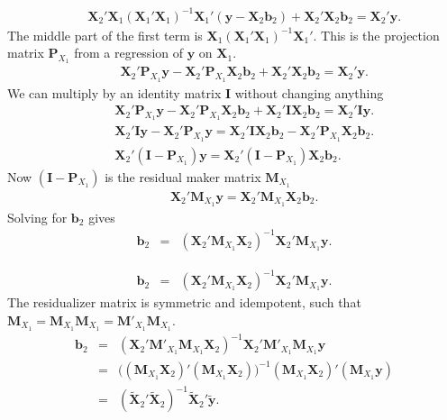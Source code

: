 \documentclass[a4paper,12pt]{article}
\begin{document}
\begin{eqnarray}
&&\bm{X}_2'\bm{X}_1(\bm{X}_1'\bm{X}_1)^{-1}\bm{X}_1'(\bm{y}-\bm{X}_2\bm{b}_2)+\bm{X}_2'\bm{X}_2\bm{b}_2=\bm{X}_2'\bm{y}.\nonumber
\end{eqnarray}
The middle part of the first term is $\bm{X}_1(\bm{X}_1'\bm{X}_1)^{-1}\bm{X}_1'$. This is the projection matrix $\bm{P}_{X_1}$ from a regression of $\bm{y}$ on $\bm{X}_1$.
\begin{eqnarray}
&&\bm{X}_2'\bm{P}_{X_1}\bm{y}-\bm{X}_2'\bm{P}_{X_1}\bm{X}_2\bm{b}_2+\bm{X}_2'\bm{X}_2\bm{b}_2=\bm{X}_2'\bm{y}.\nonumber
\end{eqnarray}
We can multiply by an identity matrix $\bm{I}$ without changing anything
\begin{eqnarray}
&&\bm{X}_2'\bm{P}_{X_1}\bm{y}-\bm{X}_2'\bm{P}_{X_1}\bm{X}_2\bm{b}_2+\bm{X}_2'\bm{I}\bm{X}_2\bm{b}_2=\bm{X}_2'\bm{I}\bm{y}.\nonumber\\
&&\bm{X}_2'\bm{I}\bm{y}-\bm{X}_2'\bm{P}_{X_1}\bm{y}=\bm{X}_2'\bm{I}\bm{X}_2\bm{b}_2-\bm{X}_2'\bm{P}_{X_1}\bm{X}_2\bm{b}_2.\nonumber\\
&&\bm{X}_2'(\bm{I}-\bm{P}_{X_1})\bm{y}=\bm{X}_2'(\bm{I}-\bm{P}_{X_1})\bm{X}_2\bm{b}_2.\nonumber
\end{eqnarray}
Now $(\bm{I}-\bm{P}_{X_1})$ is the residual maker matrix $\bm{M}_{X_1}$
\begin{eqnarray}
&&\bm{X}_2'\bm{M}_{X_1}\bm{y}=\bm{X}_2'\bm{M}_{X_1}\bm{X}_2\bm{b}_2.\nonumber
\end{eqnarray}
Solving for $\bm{b}_2$ gives
\begin{eqnarray}
\bm{b}_2&=&(\bm{X}_2'\bm{M}_{X_1}\bm{X}_2)^{-1}\bm{X}_2'\bm{M}_{X_1}\bm{y}.\nonumber
\end{eqnarray}


\begin{eqnarray}
\bm{b}_2&=&(\bm{X}_2'\bm{M}_{X_1}\bm{X}_2)^{-1}\bm{X}_2'\bm{M}_{X_1}\bm{y}.\nonumber
\end{eqnarray}
The residualizer matrix is symmetric and idempotent, such that $\bm{M}_{X_1}=\bm{M}_{X_1}\bm{M}_{X_1}=\bm{M}'_{X_1}\bm{M}_{X_1}$.
\begin{eqnarray}
\bm{b}_2&=&(\bm{X}_2'\bm{M}'_{X_1}\bm{M}_{X_1}\bm{X}_2)^{-1}\bm{X}_2'\bm{M}'_{X_1}\bm{M}_{X_1}\bm{y}\nonumber\\
&=&\bigg((\bm{M}_{X_1}\bm{X}_2)'(\bm{M}_{X_1}\bm{X}_2)\bigg)^{-1}(\bm{M}_{X_1}\bm{X}_2)'(\bm{M}_{X_1}\bm{y})\nonumber\\
&=&(\bm{\tilde{X}}_2'\bm{\tilde{X}}_2)^{-1}\bm{\tilde{X}}_2'\bm{\tilde{y}}.\nonumber
\end{eqnarray}
\end{document}
